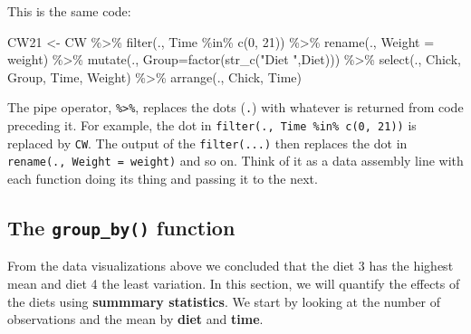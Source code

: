 \documentclass[
  14pt,
]{memoir}
\newenvironment{Shaded}{\begin{snugshade}}{\end{snugshade}}
\newcommand{\AttributeTok}[1]{\textcolor[rgb]{0.77,0.63,0.00}{#1}}
\newcommand{\DecValTok}[1]{\textcolor[rgb]{0.00,0.00,0.81}{#1}}
\newcommand{\FunctionTok}[1]{\textcolor[rgb]{0.00,0.00,0.00}{#1}}
\newcommand{\NormalTok}[1]{#1}
\newcommand{\OtherTok}[1]{\textcolor[rgb]{0.56,0.35,0.01}{#1}}
\newcommand{\SpecialCharTok}[1]{\textcolor[rgb]{0.00,0.00,0.00}{#1}}
\newcommand{\StringTok}[1]{\textcolor[rgb]{0.31,0.60,0.02}{#1}}
\begin{document}
This is the same code:

\begin{Shaded}
\begin{Highlighting}[]
\NormalTok{CW21 }\OtherTok{\textless{}{-}}\NormalTok{ CW }\SpecialCharTok{\%\textgreater{}\%} 
  \FunctionTok{filter}\NormalTok{(., Time }\SpecialCharTok{\%in\%} \FunctionTok{c}\NormalTok{(}\DecValTok{0}\NormalTok{, }\DecValTok{21}\NormalTok{)) }\SpecialCharTok{\%\textgreater{}\%} 
  \FunctionTok{rename}\NormalTok{(., }\AttributeTok{Weight =}\NormalTok{ weight) }\SpecialCharTok{\%\textgreater{}\%} 
  \FunctionTok{mutate}\NormalTok{(., }\AttributeTok{Group=}\FunctionTok{factor}\NormalTok{(}\FunctionTok{str\_c}\NormalTok{(}\StringTok{"Diet "}\NormalTok{,Diet))) }\SpecialCharTok{\%\textgreater{}\%} 
  \FunctionTok{select}\NormalTok{(., Chick, Group, Time, Weight) }\SpecialCharTok{\%\textgreater{}\%} 
  \FunctionTok{arrange}\NormalTok{(., Chick, Time) }
\end{Highlighting}
\end{Shaded}

The pipe operator, \texttt{\%\textgreater{}\%}, replaces the dots (\texttt{.}) with whatever is returned from code
preceding it. For example, the dot in \texttt{filter(.,\ Time\ \%in\%\ c(0,\ 21))} is replaced by
\texttt{CW}. The output of the \texttt{filter(...)} then replaces the dot in
\texttt{rename(.,\ Weight\ =\ weight)} and so on. Think of it as a data assembly line with
each function doing its thing and passing it to the next.

\hypertarget{the-group_by-function}{%
\subsection{\texorpdfstring{The \texttt{group\_by()} function}{The group\_by() function}}\label{the-group_by-function}}

From the data visualizations above we concluded that the diet 3 has the highest mean
and diet 4 the least variation. In this section, we will quantify the effects of the
diets using \textbf{summmary statistics}. We start by looking at the number of observations
and the mean by \textbf{diet} and \textbf{time}.
\end{document}
